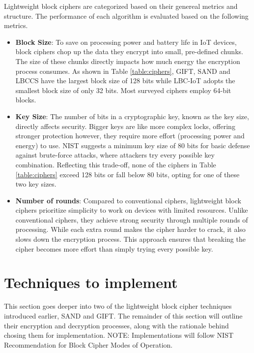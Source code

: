 \documentclass[conference]{IEEEtran}
\begin{document}
Lightweight block ciphers are categorized based on their genereal metrics and structure. The performance of each algorithm is evaluated based on the following metrics.
\begin{itemize}
    \item \textbf{Block Size}: To save on processing power and battery life in IoT devices, block ciphers chop up the data they encrypt into small, pre-defined chunks. The size of these chunks directly impacts how much energy the encryption process consumes. As shown in Table \ref{table:ciphers}, GIFT, SAND and LBCCS have the largest block size of 128 bits while LBC-IoT adopts the smallest block size of only 32 bits. Most surveyed ciphers employ 64-bit blocks.
    \item \textbf{Key Size}: The number of bits in a cryptographic key, known as the key size, directly affects security. Bigger keys are like more complex locks, offering stronger protection however, they require more effort (processing power and energy) to use. NIST suggests a minimum key size of 80 bits for basic defense against brute-force attacks, where attackers try every possible key combination\cite{barker2018transitioning}. Reflecting this trade-off, none of the ciphers in Table \ref{table:ciphers} exceed 128 bits or fall below 80 bits, opting for one of these two key sizes.
    \item \textbf{Number of rounds}: Compared to conventional ciphers, lightweight block ciphers prioritize simplicity to work on devices with limited resources. Unlike conventional ciphers, they achieve strong security through multiple rounds of processing. While each extra round makes the cipher harder to crack, it also slows down the encryption process. This approach ensures that breaking the cipher becomes more effort than simply trying every possible key.
\end{itemize}

\section{Techniques to implement} \label{tecnicas}

This section goes deeper into two of the lightweight block cipher techniques introduced earlier, SAND and GIFT. The remainder of this section will outline their encryption and decryption processes, along with the rationale behind chosing them for implementation. NOTE: Implementations will follow NIST Recommendation for Block Cipher Modes of Operation\cite{dworkin2001recommendation}.
\end{document}

